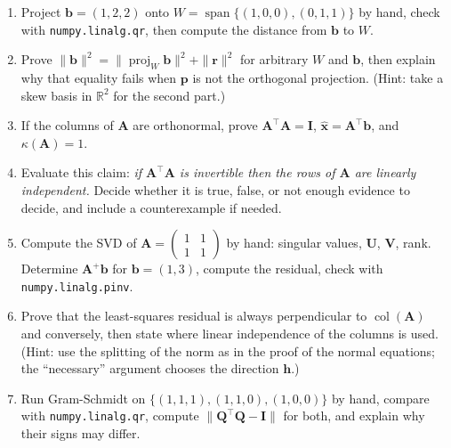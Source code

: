 \begin{latihan}
\begin{enumerate}
  \item Project $\mathbf{b}=(1,2,2)$ onto $W=\operatorname{span}\{(1,0,0),(0,1,1)\}$
        by hand, check with \texttt{numpy.linalg.qr}, then compute the distance from
        $\mathbf{b}$ to $W$.

  \item Prove $\|\mathbf{b}\|^{2}=\|\operatorname{proj}_{W}\mathbf{b}\|^{2}
        +\|\mathbf{r}\|^{2}$ for arbitrary $W$ and $\mathbf{b}$, then explain why
        that equality fails when $\mathbf{p}$ is not the orthogonal projection. (Hint: take a
        skew basis in $\mathbb{R}^{2}$ for the second part.)

  \item If the columns of $\mathbf{A}$ are orthonormal, prove $\mathbf{A}^{\top}\mathbf{A}=\mathbf{I}$,
        $\hat{\mathbf{x}}=\mathbf{A}^{\top}\mathbf{b}$, and $\kappa(\mathbf{A})=1$.

  \item Evaluate this claim: \emph{if $\mathbf{A}^{\top}\mathbf{A}$ is invertible then
        the rows of $\mathbf{A}$ are linearly independent.} Decide whether it is true, false, or not enough
        evidence to decide, and include a counterexample if needed.

  \item Compute the SVD of $\mathbf{A}=\begin{pmatrix}1&1\\ 1&1\end{pmatrix}$ by hand: singular
        values, $\mathbf{U}$, $\mathbf{V}$, rank. Determine $\mathbf{A}^{+}\mathbf{b}$
        for $\mathbf{b}=(1,3)$, compute the residual, check with
        \texttt{numpy.linalg.pinv}.

  \item Prove that the least-squares residual is always perpendicular to $\operatorname{col}(\mathbf{A})$
        and conversely, then state where linear independence of the columns is used.
        (Hint: use the splitting of the norm as in the proof of the normal equations; the
        ``necessary'' argument chooses the direction $\mathbf{h}$.)

  \item Run Gram-Schmidt on $\{(1,1,1),(1,1,0),(1,0,0)\}$ by hand, compare
        with \texttt{numpy.linalg.qr}, compute $\|\mathbf{Q}^{\top}\mathbf{Q}-\mathbf{I}\|$
        for both, and explain why their signs may differ.


\end{enumerate}
\end{latihan}

